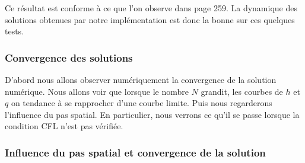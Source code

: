 \documentclass[
11pt, %
francais, %
singlespacing, %
headsepline, %
]{MastersDoctoralThesis} %
\begin{document}
Ce résultat est conforme à ce que l'on observe dans \cite{RL} page 259. La dynamique des solutions obtenues par notre implémentation est donc la bonne sur ces quelques tests.

\subsubsection{Convergence des solutions}

D’abord nous allons observer numériquement la convergence de la solution numérique. Nous allons voir que lorsque le nombre $N$ grandit, 
les courbes de $h$ et $q$ on tendance à se rapprocher d’une courbe limite. Puis nous regarderons l’influence du pas spatial. En particulier, nous verrons ce qu'il se passe lorsque la condition CFL n'est pas vérifiée.

\subsubsection{Influence du pas spatial et convergence de la solution}
\end{document}
